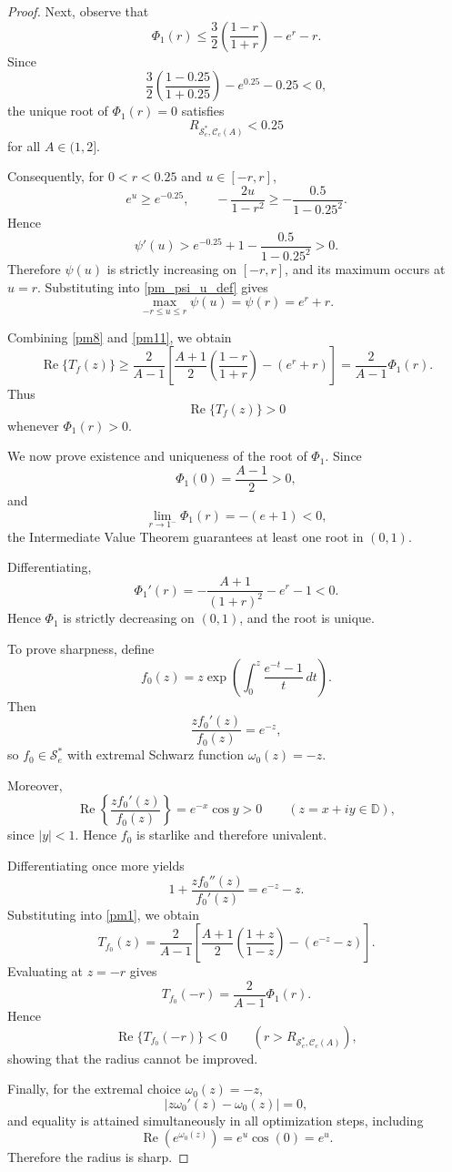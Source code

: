 \documentclass[10pt,a4paper]{amsart}
\renewcommand{\Re}{\operatorname{Re}}
\begin{document}
\begin{proof}
Next, observe that
\[
\Phi_1(r)
\le
\frac{3}{2}\left(\frac{1-r}{1+r}\right)-e^r-r.
\]
Since
\[
\frac{3}{2}\left(\frac{1-0.25}{1+0.25}\right)
-e^{0.25}
-0.25
<0,
\]
the unique root of $\Phi_1(r)=0$ satisfies
\[
R_{\mathcal S_e^*,\mathcal C_c(A)}<0.25
\]
for all $A\in(1,2]$.

Consequently, for $0<r<0.25$ and $u\in[-r,r]$,
\[
e^u\ge e^{-0.25},
\qquad
-\frac{2u}{1-r^2}
\ge
-\frac{0.5}{1-0.25^2}.
\]
Hence
\[
\psi'(u)
>
e^{-0.25}
+
1
-
\frac{0.5}{1-0.25^2}
>
0.
\]
Therefore $\psi(u)$ is strictly increasing on $[-r,r]$, and its maximum occurs at $u=r$. Substituting into \eqref{pm_psi_u_def} gives
\begin{equation}\label{pm11}
\max_{-r\le u\le r}\psi(u)
=
\psi(r)
=
e^r+r.
\end{equation}

Combining \eqref{pm8} and \eqref{pm11}, we obtain
\[
\Re\{T_f(z)\}
\ge
\frac{2}{A-1}
\left[
\frac{A+1}{2}\left(\frac{1-r}{1+r}\right)
-
(e^r+r)
\right]
=
\frac{2}{A-1}\Phi_1(r).
\]
Thus
\[
\Re\{T_f(z)\}>0
\]
whenever $\Phi_1(r)>0$.

We now prove existence and uniqueness of the root of $\Phi_1$. Since
\[
\Phi_1(0)=\frac{A-1}{2}>0,
\]
and
\[
\lim_{r\to1^-}\Phi_1(r)=-(e+1)<0,
\]
the Intermediate Value Theorem guarantees at least one root in $(0,1)$.

Differentiating,
\begin{equation}\label{pm_phi_prime}
\Phi_1'(r)
=
-\frac{A+1}{(1+r)^2}
-
e^r
-
1
<
0.
\end{equation}
Hence $\Phi_1$ is strictly decreasing on $(0,1)$, and the root is unique.

To prove sharpness, define
\begin{equation}\label{eq:extremal_f0}
f_0(z)
=
z\exp\left(
\int_0^z
\frac{e^{-t}-1}{t}\,dt
\right).
\end{equation}
Then
\[
\frac{zf_0'(z)}{f_0(z)}
=
e^{-z},
\]
so $f_0\in\mathcal S_e^*$ with extremal Schwarz function $\omega_0(z)=-z$.

Moreover,
\[
\Re\left\{
\frac{zf_0'(z)}{f_0(z)}
\right\}
=
e^{-x}\cos y>0
\qquad
(z=x+iy\in\mathbb D),
\]
since $|y|<1$. Hence $f_0$ is starlike and therefore univalent.

Differentiating once more yields
\[
1+\frac{zf_0''(z)}{f_0'(z)}
=
e^{-z}-z.
\]
Substituting into \eqref{pm1}, we obtain
\[
T_{f_0}(z)
=
\frac{2}{A-1}
\left[
\frac{A+1}{2}\left(\frac{1+z}{1-z}\right)
-
(e^{-z}-z)
\right].
\]
Evaluating at $z=-r$ gives
\[
T_{f_0}(-r)
=
\frac{2}{A-1}\Phi_1(r).
\]
Hence
\[
\Re\{T_{f_0}(-r)\}<0
\qquad
(r>R_{\mathcal S_e^*,\mathcal C_c(A)}),
\]
showing that the radius cannot be improved.

Finally, for the extremal choice $\omega_0(z)=-z$,
\[
|z\omega_0'(z)-\omega_0(z)|=0,
\]
and equality is attained simultaneously in all optimization steps, including
\[
\Re(e^{\omega_0(z)})
=
e^u\cos(0)
=
e^u.
\]
Therefore the radius is sharp.
\end{proof}
\end{document}
